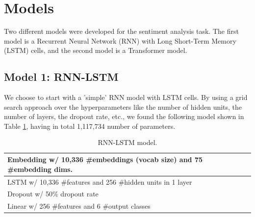 \section{Models}
Two different models were developed for the sentiment analysis task. The first model is a Recurrent Neural Network (RNN) with Long Short-Term Memory (LSTM) cells, and the second model is a Transformer model.

\subsection{Model 1: RNN-LSTM}
We choose to start with a 'simple' RNN model with LSTM cells. By using a grid search approach over the hyperparameters like the number of hidden units, the number of layers, the dropout rate, etc., we found the following model shown in Table \ref{tab:rnn_lstm_model}, having in total 1,117,734 number of parameters.
\begin{table}[H]
    \vspace*{-0.5cm}
    \centering
    \begin{tabular}{|l|}
    \hline
    Embedding w/ 10,336 \#embeddings (vocab size) and 75 \#embedding dims. \\ \hline
    LSTM w/ 10,336 \#features and 256 \#hidden units in 1 layer \\ \hline
    Dropout w/ 50\% dropout rate \\ \hline
    Linear w/ 256 \#features and 6 \#output classes \\ \hline
    \end{tabular}
    \caption{RNN-LSTM model.}
    \label{tab:rnn_lstm_model}
    \vspace*{-0.8cm}
\end{table}

